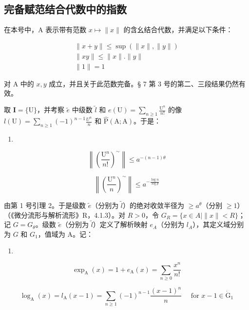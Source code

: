 \subsection{完备赋范结合代数中的指数}

在本号中，A 表示带有范数 \(x \mapsto \| x \|\) 的含幺结合代数，并满足以下条件：

\[
\begin{array}{c} \| x + y \| \leqslant \sup (\| x \|, \| y \|) \\ \| x y \| \leqslant \| x \|. \| y \| \\ \| 1 \| = 1 \end{array}
\]

对 A 中的 \(x, y\) 成立，并且关于此范数完备。§ 7 第 3 号的第二、三段结果仍然有效。

取 \(\mathbf{I} = \{\mathrm{U}\}\)，并考察 \(\tilde e\) 中级数 \(\tilde{l}\) 和 \(e(\mathrm{U}) = \sum_{n\geqslant 1}\frac{\mathrm{U}^n}{n!}\) 的像 \(l(\mathrm{U}) = \sum_{n\geqslant 1}(-1)^{n - 1}\frac{U^n}{n}\) 和 \(\hat{\mathrm{P}} (\mathrm{A};\mathrm{A})\)。于是：

\begin{enumerate}
\def\labelenumi{(\arabic{enumi})}
\setcounter{enumi}{19}
\tightlist
\item
\end{enumerate}

\[
\left\| \left(\frac {\mathrm{U} ^ {n}}{n !}\right) ^ {\sim} \right\| \leqslant a ^ {- (n - 1) \theta}\tag{20}
\]

\[
\left\| \left(\frac {\mathrm{U} ^ {n}}{n}\right) ^ {\sim} \right\| \leqslant a ^ {- \frac {\log n}{\log p}}\tag{21}
\]

由第 1 号引理 2。于是级数 \(\tilde{e}\)（分别为 \(\tilde{l}\)）的绝对收敛半径为 \(\geqslant a^\theta\)（分别 \(\geqslant 1\)）（《微分流形与解析流形》R，4.1.3）。对 \(R > 0\)，令 \(G_R = \{x \in A \mid \|x\|<R\}\)；记 \(G = G_\theta\)。级数 \(\tilde{e}\)（分别为 \(\tilde{l}\)）定义了解析映射 \(e_{A}\)（分别为 \(l_{A}\)），其定义域分别为 \(G\) 和 \(G_{1}\)，值域为 A。记：

\begin{enumerate}
\def\labelenumi{(\arabic{enumi})}
\setcounter{enumi}{21}
\tightlist
\item
\end{enumerate}

\[
\exp_ {\mathrm{A}} (x) = 1 + e _ {\mathrm{A}} (x) = \sum_ {n \geqslant 0} \frac {x ^ {n}}{n !}\tag{22}
\]

\[
\log_ {\mathrm{A}} (x) = l _ {\mathrm{A}} (x - 1) = \sum_ {n \geqslant 1} (- 1) ^ {n - 1} \frac {(x - 1) ^ {n}}{n} \quad \text { for } x - 1 \in \dot {\mathrm{G}} _ {1}\tag{23}
\]

